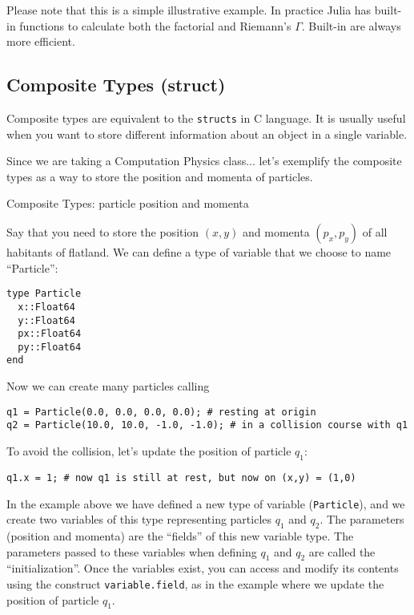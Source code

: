 Please note that this is a simple illustrative example. In practice Julia has built-in functions to calculate both the factorial and Riemann's $\Gamma$. Built-in are always more efficient.

\subsection{Composite Types (struct)}

Composite types are equivalent to the \texttt{structs} in C language. It is usually useful when you want to store different information about an object in a single variable.

Since we are taking a Computation Physics class... let's exemplify the composite types as a way to store the position and momenta of particles.

\begin{example}{Composite Types: particle position and momenta}

Say that you need to store the position $(x,y)$ and momenta $(p_x, p_y)$ of all habitants of flatland\cite{abbott2015flatland}. We can define a type of variable that we choose to name ``Particle'':

\vspace*{0.3cm}

\begin{verbatim}
type Particle
  x::Float64
  y::Float64
  px::Float64
  py::Float64
end
\end{verbatim}

Now we can create many particles calling

\begin{verbatim}
q1 = Particle(0.0, 0.0, 0.0, 0.0); # resting at origin
q2 = Particle(10.0, 10.0, -1.0, -1.0); # in a collision course with q1
\end{verbatim}

To avoid the collision, let's update the position of particle $q_1$:

\begin{verbatim}
q1.x = 1; # now q1 is still at rest, but now on (x,y) = (1,0)
\end{verbatim}
\end{example}

In the example above we have defined a new type of variable (\texttt{Particle}), and we create two variables of this type representing particles $q_1$ and $q_2$. The parameters (position and momenta) are the ``fields'' of this new variable type. The parameters passed to these variables when defining $q_1$ and $q_2$ are called the ``initialization''. Once the variables exist, you can access and modify its contents using the construct \texttt{variable.field}, as in the example where we update the position of particle $q_1$.

